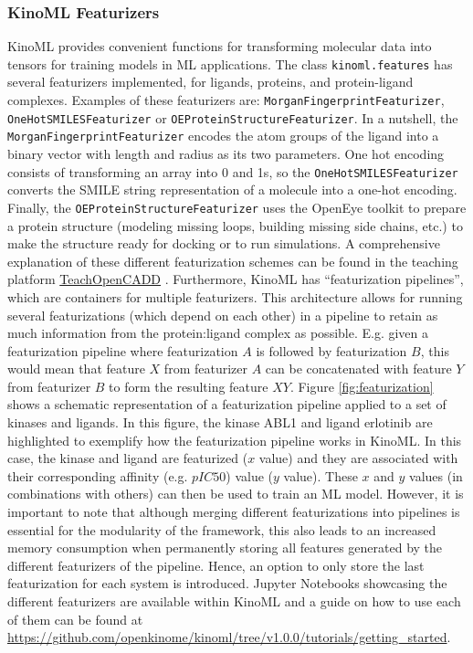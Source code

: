 \documentclass[9pt,lessons, pubversion]{livecoms}
\newcommand{\revision}[1]{\textcolor{black}{#1}}
\begin{document}
\subsubsection{KinoML Featurizers}
KinoML provides convenient functions for transforming molecular data into tensors for training models in ML applications. The class \texttt{kinoml.features} has several featurizers implemented, for ligands, proteins, and protein-ligand complexes. Examples of these featurizers are: \texttt{MorganFingerprintFeaturizer}, \texttt{One\-Hot\-SMILES\-Featurizer} or \texttt{OEProteinStructureFeaturizer}. In a nutshell, the \texttt{MorganFingerprintFeaturizer} encodes the atom groups of the ligand into a binary vector with length and radius as its two parameters. One hot encoding consists of transforming an array into 0 and 1s, so the \texttt{OneHotSMILESFeaturizer} converts the SMILE string representation of a molecule into a one-hot encoding. Finally, the \texttt{OEProtein\-Structure\-Featurizer} uses the OpenEye toolkit to prepare a protein structure (modeling missing loops, building missing side chains, etc.) to make the structure ready for docking or to run simulations. 
A comprehensive explanation of these different featurization schemes can be found in the teaching platform \revision{\href{https://github.com/volkamerlab/teachopencadd/tree/master/teachopencadd/talktorials/T033_molecular_representations}{TeachOpenCADD}} \cite{Backenkhler2023}. Furthermore, KinoML has ``featurization pipelines'', which are containers for multiple featurizers. This architecture allows for running several featurizations (which depend on each other) in a pipeline to retain as much information from the protein:ligand complex as possible. E.g. given a featurization pipeline where featurization $A$ is followed by featurization $B$, this would mean that feature $X$ from featurizer $A$ can be concatenated with feature $Y$ from featurizer $B$ to form the resulting feature $XY$. Figure \ref{fig:featurization} shows a schematic representation of a featurization pipeline applied to a set of kinases and ligands. In this figure, the kinase ABL1 and ligand erlotinib are highlighted to exemplify how the featurization pipeline works in KinoML. In this case, the kinase and ligand are featurized ($x$ value) and they are associated with their corresponding affinity (e.g. $pIC50$) value ($y$ value). These $x$ and $y$ values (in combinations with others) can then be used to train an ML model. However, it is important to note that although merging different featurizations into pipelines is essential for the modularity of the framework, this also leads to an increased memory consumption when permanently storing all features generated by the different featurizers of the pipeline. Hence, an option to only store the last featurization for each system is introduced. Jupyter Notebooks showcasing the different featurizers are available within KinoML and a guide on how to use each of them can be found at \url{https://github.com/openkinome/kinoml/tree/v1.0.0/tutorials/getting_started}.\\
\end{document}
